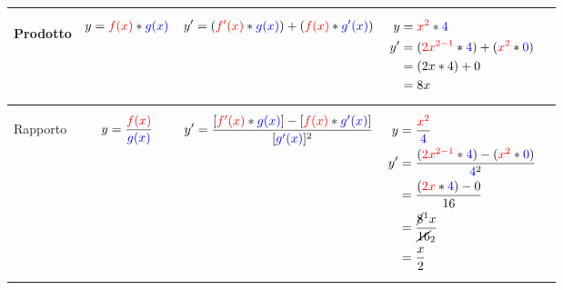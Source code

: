 \begin{center}
{\begin{tabular}{ |p{5em} | p{5em} | p{5em} | p{7em} | p{2cm}| }
            \hline
            
            \begin{center}
                Prodotto
            \end{center} &
            \begin{align}
                y= {\color{red}f(x)} * {\color{blue}g(x)} \nonumber
            \end{align}  &
            \begin{align}
                y'= ({\color{red}f'(x)} * {\color{blue}g(x)} ) + ( {\color{red}f(x)} * {\color{blue}g'(x)}) \nonumber
            \end{align} &
            {
                \begin{align}
                    y  &= {\color{red}x^2} * {\color{blue}4}   \nonumber \\
                    y' &= ( {\color{red}2x^{2-1}} * {\color{blue}4} ) + ( {\color{red}x^2} * {\color{blue}0} ) \nonumber \\
                        &= (2x * 4) + 0 \nonumber \\
                        &= 8x \nonumber 
                \end{align}
            } &
            \begin{center}
            \end{center} \\ 

            \hline
            
            \begin{center}
                Rapporto
            \end{center} &
            \begin{align}
                y= \frac{\color{red}f(x)}{\color{blue}g(x)} \nonumber
            \end{align}  &
            \begin{align}
                y'= \frac{[{\color{red}f'(x)} * {\color{blue}g(x)} ] - [ {\color{red}f(x)} * {\color{blue}g'(x)}]}{[{\color{blue}g'(x)}]^2} \nonumber
            \end{align} &
            {
                \begin{align}
                    y  &= \frac{\color{red}x^2}{\color{blue}4}   \nonumber \\
                    y' &= \frac{( {\color{red}2x^{2-1}} * {\color{blue}4} ) - ( {\color{red}x^2} * {\color{blue}0} )}{{\color{blue}4}^2} \nonumber \\
                        &= \frac{({\color{red}2x} * {\color{blue}4}) - 0}{16} \nonumber \\
                        &= \frac{\cancel{8}^1x}{\cancel{16}_2} \nonumber  \\
                        &= \frac{x}{2} \nonumber
                \end{align}
            } &
            \begin{center}
            \end{center} \\ 


\end{tabular}}
\end{center}
